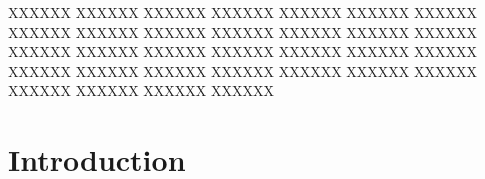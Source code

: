 \documentclass[letterpaper,11pt]{report}
\begin{document}
XXXXXX XXXXXX XXXXXX XXXXXX XXXXXX XXXXXX XXXXXX XXXXXX XXXXXX XXXXXX XXXXXX XXXXXX XXXXXX XXXXXX XXXXXX XXXXXX XXXXXX XXXXXX XXXXXX XXXXXX XXXXXX XXXXXX XXXXXX XXXXXX XXXXXX XXXXXX XXXXXX XXXXXX XXXXXX XXXXXX XXXXXX XXXXXX 

\newpage

\tableofcontents
\listoffigures 
\listoftables

\newpage

\newpage

\newpage
\mbox{}



\chapter{Introduction}\label{chapter:introduction}
\setcounter{page}{1}
\onehalfspacing
\cite{Perugini:2007:SOI:1240624.1240770}


%

%
%


\end{document}
